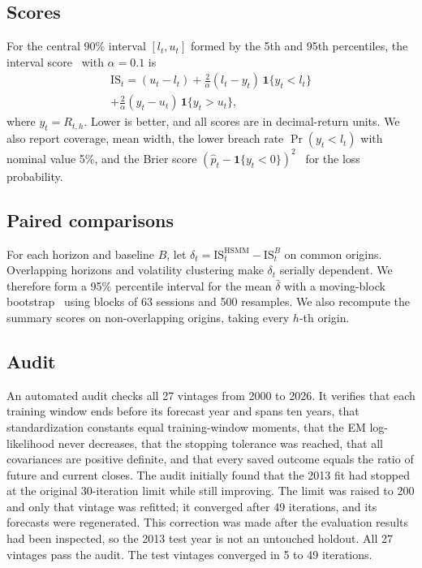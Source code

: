 \documentclass[conference]{IEEEtran}
\newcommand{\ind}{\mathbf{1}}
\begin{document}
\subsection{Scores}
For the central 90\% interval $[l_t,u_t]$ formed by the 5th and 95th percentiles, the interval score~\cite{gneiting2007} with $\alpha=0.1$ is
\begin{multline}
\mathrm{IS}_t=(u_t-l_t)+\frac{2}{\alpha}(l_t-y_t)\,\ind\{y_t<l_t\}\\
+\frac{2}{\alpha}(y_t-u_t)\,\ind\{y_t>u_t\},
\label{eq:is}
\end{multline}
where $y_t=R_{t,h}$. Lower is better, and all scores are in decimal-return units. We also report coverage, mean width, the lower breach rate $\Pr(y_t<l_t)$ with nominal value 5\%, and the Brier score $(\hat p_t-\ind\{y_t<0\})^2$~\cite{brier1950} for the loss probability.

\subsection{Paired comparisons}
For each horizon and baseline $B$, let $\delta_t=\mathrm{IS}^{\mathrm{HSMM}}_t-\mathrm{IS}^{B}_t$ on common origins. Overlapping horizons and volatility clustering make $\delta_t$ serially dependent. We therefore form a 95\% percentile interval for the mean $\bar\delta$ with a moving-block bootstrap~\cite{kunsch1989} using blocks of 63 sessions and 500 resamples. We also recompute the summary scores on non-overlapping origins, taking every $h$-th origin.

\subsection{Audit}
An automated audit checks all 27 vintages from 2000 to 2026. It verifies that each training window ends before its forecast year and spans ten years, that standardization constants equal training-window moments, that the EM log-likelihood never decreases, that the stopping tolerance was reached, that all covariances are positive definite, and that every saved outcome equals the ratio of future and current closes. The audit initially found that the 2013 fit had stopped at the original 30-iteration limit while still improving. The limit was raised to 200 and only that vintage was refitted; it converged after 49 iterations, and its forecasts were regenerated. This correction was made after the evaluation results had been inspected, so the 2013 test year is not an untouched holdout. All 27 vintages pass the audit. The test vintages converged in 5 to 49 iterations.
\end{document}
